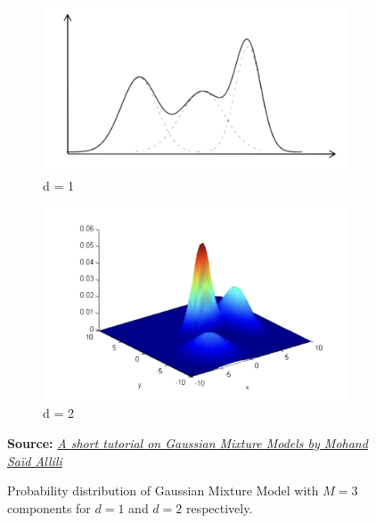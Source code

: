 \begin{figure}[htbp]
    \centering
    \begin{subfigure}[b]{0.48\textwidth}
        \centering
        \includegraphics[width=\textwidth]{Figs/d_1_gaussian_mix.png}
        \caption{d = 1}
        \label{fig:1_d_guaussian_mix}
    \end{subfigure}
    \hfill
    \begin{subfigure}[b]{0.48\textwidth}
        \centering
        \includegraphics[width=\textwidth]{Figs/d_2_gaussian_mix.png}
        \caption{d = 2}
        \label{fig:2_d_guaussian_mix}
    \end{subfigure}
        \caption*{\textbf{Source:} \href{https://web.iitd.ac.in/~sumeet/GMM_said_crv10_tutorial.pdf}{\textit{A short tutorial on Gaussian Mixture Models by Mohand Saïd Allili}}}
        \caption[Probability distribution of Gaussian Mixture Model]{Probability distribution of Gaussian Mixture Model with $M=3$ components for $d=1$ and $d=2$ respectively.}
    \label{fig:gaussian_mix}
\end{figure}

